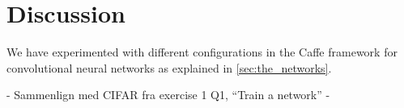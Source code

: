 \graphicspath{{Chapters/Project/}}

\section{Discussion} %
\label{sec:discussion}

We have experimented with different configurations in the Caffe framework for convolutional neural
networks as explained in \autoref{sec:the_networks}.  
 


- Sammenlign med CIFAR fra exercise 1 Q1, ``Train a network'' 
- 


